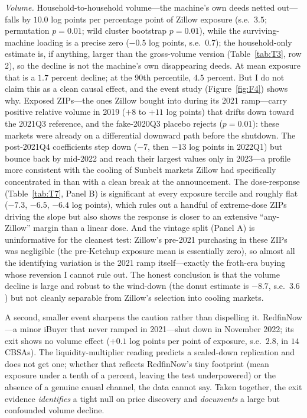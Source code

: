 \documentclass[12pt, letterpaper]{article}
\theoremstyle{remark}
\begin{document}
\emph{Volume.} Household-to-household volume---the machine's own deeds netted out---falls by $10.0$ log points per percentage point of Zillow exposure (s.e.\ $3.5$; permutation $p = 0.01$; wild cluster bootstrap $p = 0.01$), while the surviving-machine loading is a precise zero ($-0.5$ log points, s.e.\ $0.7$); the household-only estimate is, if anything, larger than the gross-volume version (Table~\ref{tab:T3}, row 2), so the decline is not the machine's own disappearing deeds. At mean exposure that is a $1.7$ percent decline; at the 90th percentile, $4.5$ percent. But I do not claim this as a clean causal effect, and the event study (Figure~\ref{fig:F4}) shows why. Exposed ZIPs---the ones Zillow bought into during its 2021 ramp---carry positive relative volume in 2019 ($+8$ to $+11$ log points) that drifts down toward the 2021Q3 reference, and the fake-2020Q3 placebo rejects ($p = 0.01$): these markets were already on a differential downward path before the shutdown. The post-2021Q4 coefficients step down ($-7$, then $-13$ log points in 2022Q1) but bounce back by mid-2022 and reach their largest values only in 2023---a profile more consistent with the cooling of Sunbelt markets Zillow had specifically concentrated in than with a clean break at the announcement. The dose-response (Table~\ref{tab:T7}, Panel B) is significant at every exposure tercile and roughly flat ($-7.3$, $-6.5$, $-6.4$ log points), which rules out a handful of extreme-dose ZIPs driving the slope but also shows the response is closer to an extensive ``any-Zillow'' margin than a linear dose. And the vintage split (Panel A) is uninformative for the cleanest test: Zillow's pre-2021 purchasing in these ZIPs was negligible (the pre-Ketchup exposure mean is essentially zero), so almost all the identifying variation is the 2021 ramp itself---exactly the froth-era buying whose reversion I cannot rule out. The honest conclusion is that the volume decline is large and robust to the wind-down (the donut estimate is $-8.7$, s.e.\ $3.6$) but not cleanly separable from Zillow's selection into cooling markets.

A second, smaller event sharpens the caution rather than dispelling it. RedfinNow---a minor iBuyer that never ramped in 2021---shut down in November 2022; its exit shows no volume effect ($+0.1$ log points per point of exposure, s.e.\ $2.8$, in $14$ CBSAs). The liquidity-multiplier reading predicts a scaled-down replication and does not get one; whether that reflects RedfinNow's tiny footprint (mean exposure under a tenth of a percent, leaving the test underpowered) or the absence of a genuine causal channel, the data cannot say. Taken together, the exit evidence \emph{identifies} a tight null on price discovery and \emph{documents} a large but confounded volume decline.
\end{document}
